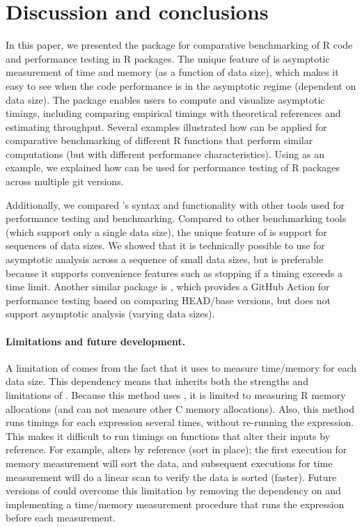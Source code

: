 \section{Discussion and conclusions}

In this paper, we presented the  package for comparative benchmarking of R code and performance testing in R packages.
The unique feature of  is asymptotic measurement of time and memory (as a function of data size), which makes it easy to see when the code performance is in the asymptotic regime (dependent on data size).
The  package enables users to compute and visualize asymptotic timings, including comparing empirical timings with theoretical references and estimating throughput.
Several examples illustrated how  can be applied for comparative benchmarking of different R functions that perform similar computations (but with different performance characteristics).
Using  as an example, we explained how  can be used for performance testing of R packages across multiple git versions. 

Additionally, we compared 's syntax and functionality with other tools used for performance testing and benchmarking. 
Compared to other benchmarking tools (which support only a single data size), the unique feature of  is support for sequences of data sizes. 
We showed that it is technically possible to use  for asymptotic analysis across a sequence of small data sizes, but  is preferable because it supports convenience features such as stopping if a timing exceeds a time limit.
Another similar package is , which provides a GitHub Action for performance testing based on comparing HEAD/base versions, but does not support asymptotic analysis (varying data sizes).

\paragraph{Limitations and future development.}
A limitation of  comes from the fact that it uses  to measure time/memory for each data size.
This dependency means that  inherits both the strengths and limitations of .
Because this method uses , it is limited to measuring R memory allocations (and can not measure other C memory allocations).
Also, this method runs timings for each expression several times, without re-running the  expression.
This makes it difficult to run timings on functions that alter their inputs by reference.
For example,  alters  by reference (sort in place); the first execution for memory measurement will sort the data, and subsequent executions for time measurement will do a linear scan to verify the data is sorted (faster).
Future versions of  could overcome this limitation by removing the dependency on  and implementing a time/memory measurement procedure that runs the  expression before each measurement.

